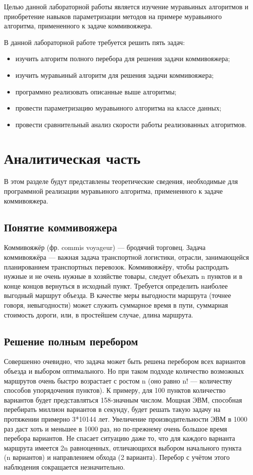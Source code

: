 \documentclass[12pt]{report}
\begin{document}
Целью данной лабораторной работы является изучение муравьиных алгоритмов и приобретение навыков параметризации методов на примере муравьиного алгоритма, примененного к задаче коммивояжера.

В данной лабораторной работе требуется решить пять задач:
\begin{itemize}
\item изучить алгоритм полного перебора для решения задачи коммивояжера;
\item изучить муравьиный алгоритм для решения задачи коммивояжера;
\item программно реализовать описанные выше алгоритмы;
\item провести параметризацию муравьиного алгоритма на классе данных;
\item провести сравнительный анализ скорости работы реализованных алгоритмов.
\end{itemize}


\chapter{Аналитическая часть}

В этом разделе будут представлены теоретические сведения, необходимые для программной реализации муравьиного алгоритма, примененного к задаче коммивояжера.
 
\section{Понятие коммивояжера}
 Коммивояжёр (фр. commis voyageur) — бродячий торговец. Задача коммивояжёра — важная задача транспортной логистики, отрасли, занимающейся планированием транспортных перевозок. Коммивояжёру, чтобы распродать нужные и не очень нужные в хозяйстве товары, следует объехать n пунктов и в конце концов вернуться в исходный пункт. Требуется определить наиболее выгодный маршрут объезда. В качестве меры выгодности маршрута (точнее говоря, невыгодности) может служить суммарное время в пути, суммарная стоимость дороги, или, в простейшем случае, длина маршрута\cite{Commis}.

\section{Решение полным перебором}
Совершенно очевидно, что задача может быть решена перебором всех вариантов объезда и выбором оптимального. Но при таком подходе количество возможных маршрутов очень быстро возрастает с ростом n (оно равно n! — количеству способов упорядочения пунктов). К примеру, для 100 пунктов количество вариантов будет представляться 158-значным числом. Мощная ЭВМ, способная перебирать миллион вариантов в секунду, будет решать такую задачу на протяжении примерно 3*10144 лет. Увеличение производительности ЭВМ в 1000 раз даст хоть и меньшее в 1000 раз, но по-прежнему очень большое время перебора вариантов. Не спасает ситуацию даже то, что для каждого варианта маршрута имеется 2n равноценных, отличающихся выбором начального пункта (n вариантов) и направлением обхода (2 варианта). Перебор с учётом этого наблюдения сокращается незначительно. 
\end{document}
